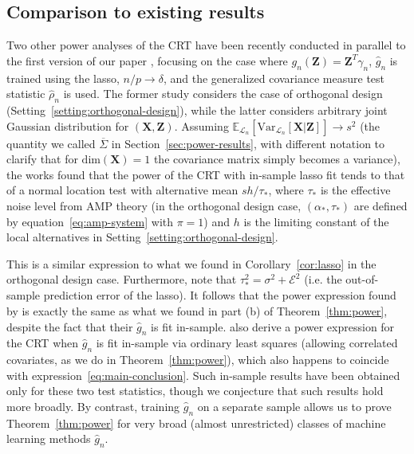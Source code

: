 \documentclass[12pt]{article}
\theoremstyle{definition}
\theoremstyle{remark}
\newcommand{\prx}{\bm X}
\newcommand{\prz}{\bm Z}
\begin{document}
\subsection{Comparison to existing results} \label{sec:comparison-to-existing-results-4}

Two other power analyses of the CRT have been recently conducted \cite{Wang2020b, Celentano2020} in parallel to the first version of our paper \cite{Katsevich2020a}, focusing on the case where $g_n(\prz) = \prz^T \gamma_n$, $\widehat g_n$ is trained using the lasso, $n/p \rightarrow \delta$, and the generalized covariance measure test statistic $\widehat \rho_n$ is used. The former study considers the case of orthogonal design (Setting~\ref{setting:orthogonal-design}), while the latter considers arbitrary joint Gaussian distribution for $(\prx,\prz)$. Assuming $\mathbb E_{\mathcal L_n}[\text{Var}_{\mathcal L_n}[\prx|\prz]] \rightarrow s^2$ (the quantity we called $\overline \Sigma$ in Section~\ref{sec:power-results}, with different notation to clarify that for $\text{dim}(\prx) = 1$ the covariance matrix simply becomes a variance), the works \cite{Wang2020b, Celentano2020} found that the power of the CRT with in-sample lasso fit tends to that of a normal location test with alternative mean $sh/\tau_*$, where $\tau_*$ is the effective noise level from AMP theory (in the orthogonal design case, $(\alpha_*, \tau_*)$ are defined by equation~\eqref{eq:amp-system} with $\pi = 1$) and $h$ is the limiting constant of the local alternatives in Setting~\ref{setting:orthogonal-design}. 

This is a similar expression to what we found in Corollary~\ref{cor:lasso} in the orthogonal design case. Furthermore, note that $\tau_*^2 = \sigma^2 + \mathcal E^2$ (i.e. the out-of-sample prediction error of the lasso). It follows that the power expression found by \cite{Wang2020b, Celentano2020} is exactly the same as what we found in part (b) of Theorem~\ref{thm:power}, despite the fact that their $\widehat g_n$ is fit in-sample. 
\cite{Wang2020b} also derive a power expression for the CRT when $\widehat g_n$ is fit in-sample via ordinary least squares (allowing correlated covariates, as we do in Theorem~\ref{thm:power}), which also happens to coincide with expression~\eqref{eq:main-conclusion}. Such in-sample results have been obtained only for these two test statistics, though we conjecture that such results hold more broadly.
By contrast, training $\widehat g_n$ on a separate sample allows us to prove Theorem~\ref{thm:power} for very broad (almost unrestricted) classes of machine learning methods $\widehat g_n$.
\end{document}
